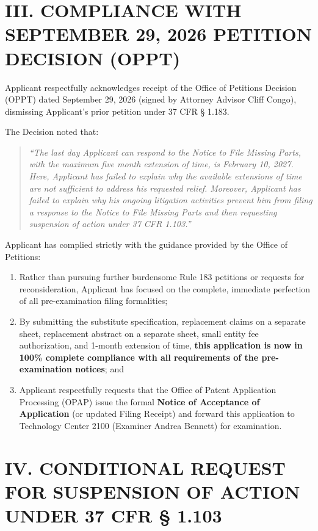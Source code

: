 \documentclass[11pt,letterpaper]{article}
\begin{document}
\section*{III. COMPLIANCE WITH SEPTEMBER 29, 2026 PETITION DECISION (OPPT)}

Applicant respectfully acknowledges receipt of the Office of Petitions Decision (OPPT) dated September 29, 2026 (signed by Attorney Advisor Cliff Congo), dismissing Applicant's prior petition under 37 CFR \S{} 1.183. 

The Decision noted that:
\begin{quote}
\textit{``The last day Applicant can respond to the Notice to File Missing Parts, with the maximum five month extension of time, is February 10, 2027. Here, Applicant has failed to explain why the available extensions of time are not sufficient to address his requested relief. Moreover, Applicant has failed to explain why his ongoing litigation activities prevent him from filing a response to the Notice to File Missing Parts and then requesting suspension of action under 37 CFR 1.103.''}
\end{quote}

Applicant has complied strictly with the guidance provided by the Office of Petitions:
\begin{enumerate}[leftmargin=2em, itemsep=2pt, parsep=0pt]
    \item Rather than pursuing further burdensome Rule 183 petitions or requests for reconsideration, Applicant has focused on the complete, immediate perfection of all pre-examination filing formalities;
    \item By submitting the substitute specification, replacement claims on a separate sheet, replacement abstract on a separate sheet, small entity fee authorization, and 1-month extension of time, \textbf{this application is now in 100\% complete compliance with all requirements of the pre-examination notices}; and
    \item Applicant respectfully requests that the Office of Patent Application Processing (OPAP) issue the formal \textbf{Notice of Acceptance of Application} (or updated Filing Receipt) and forward this application to Technology Center 2100 (Examiner Andrea Bennett) for examination.
\end{enumerate}

\section*{IV. CONDITIONAL REQUEST FOR SUSPENSION OF ACTION UNDER 37 CFR \S{} 1.103}
\end{document}
